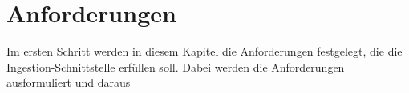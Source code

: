 \chapter{Anforderungen}

Im ersten Schritt werden in diesem Kapitel die Anforderungen festgelegt, die die Ingestion-Schnittstelle erfüllen soll.
Dabei werden die Anforderungen ausformuliert und daraus 